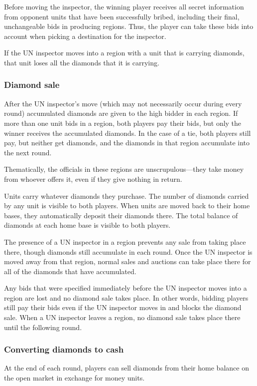 \documentclass[12pt]{article}
\begin{document}
Before moving the inspector, the winning player receives all secret information from opponent units that have been successfully bribed, including their final, unchangeable bids in producing regions.  Thus, the player can take these bids into account when picking a destination for the inspector.

If the UN inspector moves into a region with a unit that is carrying diamonds, that unit loses all the diamonds that it is carrying.


\subsubsection{Diamond sale}
After the UN inspector's move (which may not necessarily occur during every round) accumulated diamonds are given to the high bidder in each region.  If more than one unit bids in a region, both players pay their bids, but only the winner receives the accumulated diamonds.  In the case of a tie, both players still pay, but neither get diamonds, and the diamonds in that region accumulate into the next round.

Thematically, the officials in these regions are unscrupulous---they take money from whoever offers it, even if they give nothing in return.

Units carry whatever diamonds they purchase.  The number of diamonds carried by any unit is visible to both players.  When units are moved back to their home bases, they automatically deposit their diamonds there.  The total balance of diamonds at each home base is visible to both players.

The presence of a UN inspector in a region prevents any sale from taking place there, though diamonds still accumulate in each round.  Once the UN inspector is moved away from that region, normal sales and auctions can take place there for all of the diamonds that have accumulated.

Any bids that were specified immediately before the UN inspector moves into a region are lost and no diamond sale takes place.  In other words, bidding players still pay their bids even if the UN inspector moves in and blocks the diamond sale.  When a UN inspector leaves a region, no diamond sale takes place there until the following round.

\subsubsection{Converting diamonds to cash}
At the end of each round, players can sell diamonds from their home balance on the open market in exchange for money units.  
\end{document}
